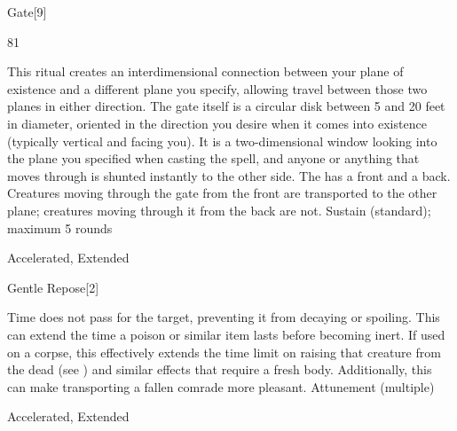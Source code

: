 \begin{spellsection}{Gate}[9]
\begin{spellcontent}
\begin{spelltargetinginfo}
\spellrng{\rngclose}
 81
\end{spelltargetinginfo}
\begin{spelleffects}
\spelleffect
This ritual creates an interdimensional connection between your plane of existence and a different plane you specify, allowing travel between those two planes in either direction.
The gate itself is a circular disk between 5 and 20 feet in diameter, oriented in the direction you desire when it comes into existence (typically vertical and facing you).
It is a two-dimensional window looking into the plane you specified when casting the spell, and anyone or anything that moves through is shunted instantly to the other side.
The  has a front and a back. Creatures moving through the gate from the front are transported to the other plane; creatures moving through it from the back are not.
\spelldur Sustain (standard); maximum 5 rounds
\end{spelleffects}
\end{spellcontent}
\begin{spellfooter}
 Accelerated, Extended
\end{spellfooter}
\begin{spellsubcontent}
\end{spellsubcontent}
\end{spellsection}
\begin{spellsection}{Gentle Repose}[2]
\begin{spellcontent}
\begin{spelltargetinginfo}
\end{spelltargetinginfo}
\begin{spelleffects}
\spelleffect
Time does not pass for the target, preventing it from decaying or spoiling.
This can extend the time a poison or similar item lasts before becoming inert.
If used on a corpse, this effectively extends the time limit on raising that creature from the dead (see ) and similar effects that require a fresh body.
Additionally, this can make transporting a fallen comrade more pleasant.
\spelldur Attunement (multiple)
\end{spelleffects}
\end{spellcontent}
\begin{spellfooter}
 Accelerated, Extended
\end{spellfooter}
\begin{spellsubcontent}
\end{spellsubcontent}
\end{spellsection}
